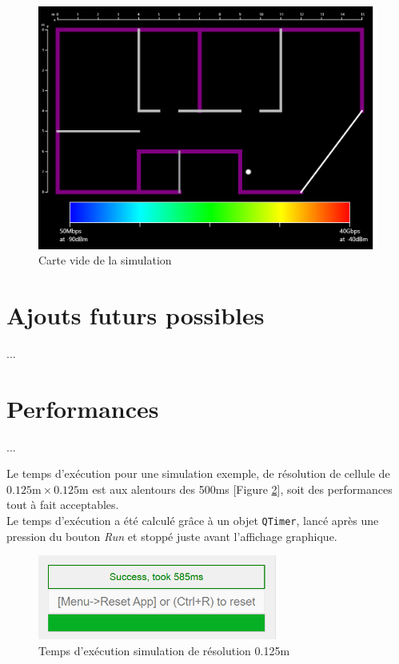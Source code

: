 \begin{figure}[H]
    \centering
    \includegraphics[width=\textwidth]{latex/images/blank_map.png}
    \caption{Carte vide de la simulation}
    \label{fig:blank-map}
\end{figure}

\section{Ajouts futurs possibles}
...

\section{Performances}
...

Le temps d'exécution pour une simulation exemple, de résolution de cellule de $0.125\mathrm{m}\times0.125\mathrm{m}$ est aux alentours des 500ms [Figure \ref{fig:time-0.125m}], soit des performances tout à fait acceptables.\\
Le temps d'exécution a été calculé grâce à un objet \texttt{QTimer}, lancé après une pression du bouton \textit{Run} et stoppé juste avant l'affichage graphique.
\begin{figure}[H]
    \centering
    \includegraphics[width=0.7\textwidth]{latex/images/time-0.125m.png}
    \caption{Temps d'exécution simulation de résolution 0.125m}
    \label{fig:time-0.125m}
\end{figure}
